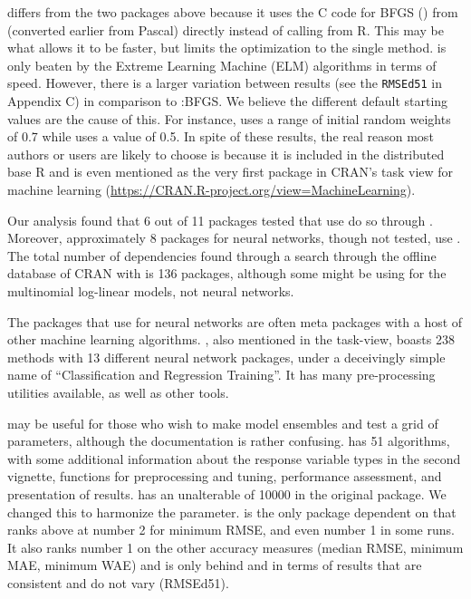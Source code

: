  \citep{R-nnet} differs from the two packages above
because it uses the \textsf{C} code for BFGS () from
 (converted earlier from Pascal) directly instead of calling
 from \textsf{R}. This may be what allows it to be faster,
but limits the optimization to the single method.  is only
beaten by the Extreme Learning Machine (ELM) algorithms in terms of
speed. However, there is a larger variation between results (see the
\texttt{RMSEd51} in Appendix C) in comparison to
:BFGS. We believe the different default starting
values are the cause of this. For instance,  uses a range
of initial random weights of 0.7 while  uses a value
of 0.5. In spite of these results, the real reason most authors or users
are likely to choose  is because it is included in the
distributed base \textsf{R} and is even mentioned as the very first
package in CRAN's task view for machine learning
(\url{https://CRAN.R-project.org/view=MachineLearning}).

Our analysis found that 6 out of 11 packages tested that use
 do so through . Moreover, approximately 8
packages for neural networks, though not tested, use . The
total number of  dependencies found through a search
through the offline database of CRAN with  is 136
packages, although some might be using  for the
multinomial log-linear models, not neural networks.

The packages that use  for neural networks are often meta
packages with a host of other machine learning algorithms.
 \citep{R-caret}, also mentioned in the task-view, boasts
238 methods with 13 different neural network packages, under a
deceivingly simple name of ``Classification and Regression Training''.
It has many pre-processing utilities available, as well as other tools.

 \citep{R-EnsembleBase} may be useful for those
who wish to make model ensembles and test a grid of parameters, although
the documentation is rather confusing. 
\citep{R-MachineShop} has 51 algorithms, with some additional
information about the response variable types in the second vignette,
functions for preprocessing and tuning, performance assessment, and
presentation of results.  \citep{R-radiant.model}
has an unalterable  of 10000 in the original package. We
changed this to harmonize the  parameter. 
\citep{R-rminer} is the only package dependent on  that
ranks above  at number 2 for minimum RMSE, and even number
1 in some runs. It also ranks number 1 on the other accuracy measures
(median RMSE, minimum MAE, minimum WAE) and is only behind
 and  in terms of results that are
consistent and do not vary (RMSEd51).

